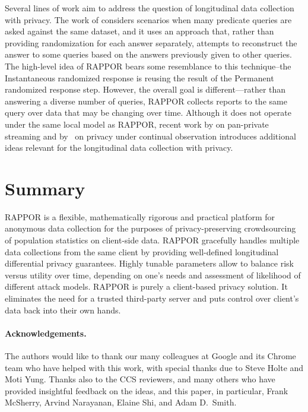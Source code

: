 \documentclass{sig-alternate-2013}
\newcommand\RAPPOR{{RAPPOR}}
\begin{document}
Several lines of work aim to address the question of longitudinal data collection with privacy. The work of \cite{MedianMech} considers scenarios when many predicate queries are asked against the same dataset, and it uses an approach that, rather than providing randomization for each answer separately, attempts to reconstruct the answer to some queries based on the answers previously given to other queries. The high-level idea of \RAPPOR{} bears some resemblance to this technique--the Instantaneous randomized response is reusing the result of the Permanent randomized response step. However, the overall goal is different---rather than answering a diverse number of queries, \RAPPOR{} collects reports to the same query over data that may be changing over time. 
Although it does not operate under the same local model as \RAPPOR{}, recent work by \cite{DworkNPRY10} on pan-private streaming and by~\cite{Dwork2010} on privacy under continual observation introduces additional ideas relevant for the longitudinal data collection with privacy.
 















\section{Summary}
\RAPPOR{} is a flexible, mathematically rigorous and practical platform for anonymous data collection
for the purposes of privacy-preserving crowdsourcing of population statistics on client-side data.
\RAPPOR{} gracefully handles multiple data collections from the same client by providing well-defined longitudinal differential privacy guarantees. Highly tunable parameters allow to balance risk versus utility over time, depending on one's needs and assessment of likelihood of different attack models. \RAPPOR{} is purely a client-based privacy solution. It eliminates the need for a trusted third-party server and puts control over client's data back into their own hands.

\paragraph{Acknowledgements.}
The authors would like to thank our many colleagues at Google and its Chrome team who have helped with this work, with special thanks due to Steve Holte and Moti Yung.
Thanks also to the CCS reviewers, and many others who have provided insightful feedback on the ideas, and this paper, 
in particular, Frank McSherry, Arvind Narayanan, Elaine Shi, and Adam D.\ Smith.
\end{document}
